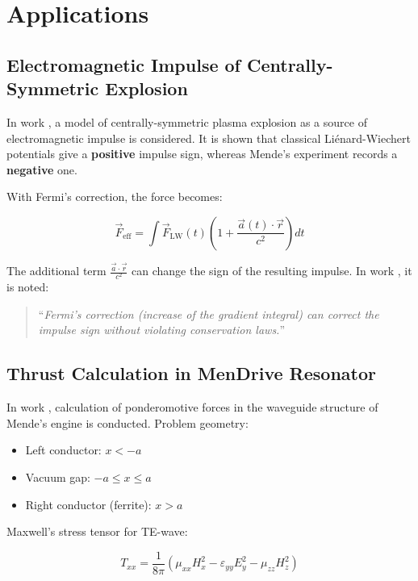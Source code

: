 \documentclass[12pt, a4paper]{article}
\begin{document}
\section{Applications}

\subsection{Electromagnetic Impulse of Centrally-Symmetric Explosion}

In work \cite{PlasmaExplosion}, a model of centrally-symmetric plasma explosion as a source of electromagnetic impulse is considered. It is shown that classical Liénard-Wiechert potentials give a \textbf{positive} impulse sign, whereas Mende's experiment records a \textbf{negative} one.

With Fermi's correction, the force becomes:

\begin{equation}
\vec{F}_{\text{eff}} = \int \vec{F}_{\text{LW}}(t) \left( 1 + \frac{\vec{a}(t) \cdot \vec{r}}{c^2} \right) dt
\label{eq:fermi_force}
\end{equation}

The additional term $\frac{\vec{a} \cdot \vec{r}}{c^2}$ can change the sign of the resulting impulse. In work \cite{PlasmaExplosion}, it is noted:

\begin{quote}
``\textit{Fermi's correction (increase of the gradient integral) can correct the impulse sign without violating conservation laws.}''
\end{quote}

\subsection{Thrust Calculation in MenDrive Resonator}

In work \cite{MenDrive}, calculation of ponderomotive forces in the waveguide structure of Mende's engine is conducted. Problem geometry:

\begin{itemize}
    \item Left conductor: $x < -a$
    \item Vacuum gap: $-a \le x \le a$
    \item Right conductor (ferrite): $x > a$
\end{itemize}

Maxwell's stress tensor for TE-wave:

\begin{equation}
T_{xx} = \frac{1}{8\pi} \left( \mu_{xx} H_x^2 - \varepsilon_{yy} E_y^2 - \mu_{zz} H_z^2 \right)
\label{eq:stress_tensor}
\end{equation}
\end{document}
